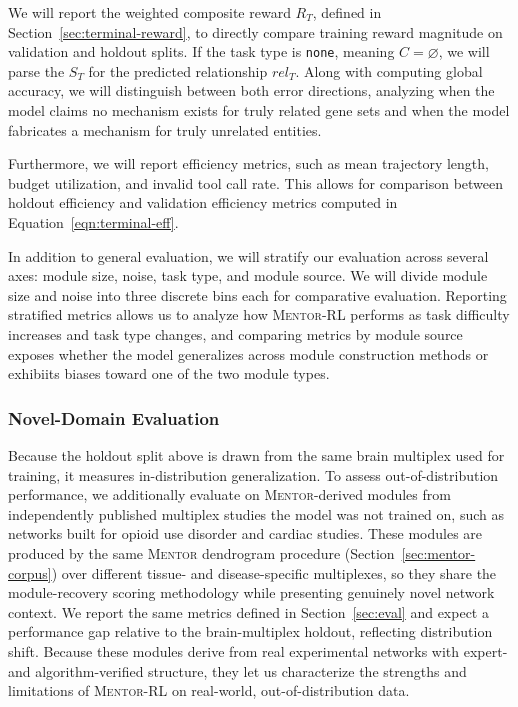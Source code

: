 \documentclass[thesis,letterpaper,12pt]{utthesis}
\begin{document}
We will report the weighted composite reward $R_T$, defined in Section~\ref{sec:terminal-reward}, to directly compare training reward magnitude on validation and holdout splits. If the task type is \texttt{none}, meaning $C = \varnothing$, we will parse the $S_T$ for the predicted relationship $rel_T$. Along with computing global accuracy, we will distinguish between both error directions, analyzing when the model claims no mechanism exists for truly related gene sets and when the model fabricates a mechanism for truly unrelated entities.

Furthermore, we will report efficiency metrics, such as mean trajectory length, budget utilization, and invalid tool call rate. This allows for comparison between holdout efficiency and validation efficiency metrics computed in Equation~\ref{eqn:terminal-eff}.

In addition to general evaluation, we will stratify our evaluation across several axes: module size, noise, task type, and module source. We will divide module size and noise into three discrete bins each for comparative evaluation. Reporting stratified metrics allows us to analyze how \textsc{Mentor-RL} performs as task difficulty increases and task type changes, and comparing metrics by module source exposes whether the model generalizes across module construction methods or exhibiits biases toward one of the two module types.

\subsubsection{Novel-Domain Evaluation}
Because the holdout split above is drawn from the same brain multiplex used for training, it measures in-distribution generalization. To assess out-of-distribution performance, we additionally evaluate on \textsc{Mentor}-derived modules from independently published multiplex studies the model was not trained on, such as networks built for opioid use disorder and cardiac studies. These modules are produced by the same \textsc{Mentor} dendrogram procedure (Section~\ref{sec:mentor-corpus}) over different tissue- and disease-specific multiplexes, so they share the module-recovery scoring methodology while presenting genuinely novel network context. We report the same metrics defined in Section~\ref{sec:eval} and expect a performance gap relative to the brain-multiplex holdout, reflecting distribution shift. Because these modules derive from real experimental networks with expert- and algorithm-verified structure, they let us characterize the strengths and limitations of \textsc{Mentor-RL} on real-world, out-of-distribution data.
\end{document}
